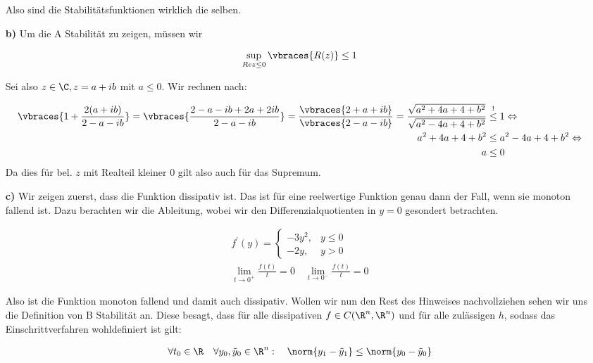 \begin{solution}
\begin{itemize}
    Also sind die Stabilitätsfunktionen wirklich die selben.

  \item[\textbf{b)}] Um die A Stabilität zu zeigen, müssen wir

    \begin{align*}
      \sup\limits_{Re z \leq 0} \vbraces{R(z)} \leq 1
    \end{align*}

    Sei also $z \in \C, z=a+ ib$ mit $a \leq 0$. Wir rechnen nach:

    \begin{align*}
      \vbraces{1+\frac{2(a+ib)}{2-a-ib}} = \vbraces{\frac{2-a-ib +2a +2ib}{2-a-ib}}
      = \frac{\vbraces{2+a+ib}}{\vbraces{2-a-ib}}
      = \frac{\sqrt{a^2 +4a +4 +b^2}}{\sqrt{a^2-4a+4+b^2}} &\stackrel{!}{\leq} 1
      \Leftrightarrow \\
      a^2 + 4a +4 +b^2 &\leq a^2 -4a +4+b^2 \Leftrightarrow \\
      a &\leq 0
    \end{align*}
    Da dies für bel. $z$ mit Realteil kleiner 0 gilt also auch für das Supremum.

  \item[\textbf{c)}] Wir zeigen zuerst, dass die Funktion dissipativ ist. Das ist für
    eine reelwertige Funktion genau dann der Fall, wenn sie monoton fallend ist. Dazu
    berachten wir die Ableitung, wobei wir den Differenzialquotienten in $y=0$  gesondert betrachten.

    \begin{align*}
      f^\prime (y) = \begin{cases}
      -3 y^2 , & y \leq 0 \\
      -2 y, & y > 0
    \end{cases} \\
    \lim\limits_{t \rightarrow 0^+} \frac{f(t)}{t} = 0 \quad
    \lim\limits_{t \rightarrow 0^-} \frac{f(t)}{t} = 0
    \end{align*}

    Also ist die Funktion monoton fallend und damit auch dissipativ. Wollen wir nun
    den Rest des Hinweises nachvollziehen sehen wir uns die Definition von B Stabilität
    an. Diese besagt, dass für alle dissipativen $f \in C(\R^n ,\R^n )$ und für alle
    zulässigen $h$, sodass das Einschrittverfahren wohldefiniert ist gilt:

    \begin{align*}
      \forall t_0 \in \R \quad \forall y_0 , \tilde{y}_0 \in \R^n : \quad
      \norm{y_1 - \tilde{y}_1} \leq \norm{y_0 - \tilde{y}_0}
    \end{align*}


\end{itemize}
\end{solution}
